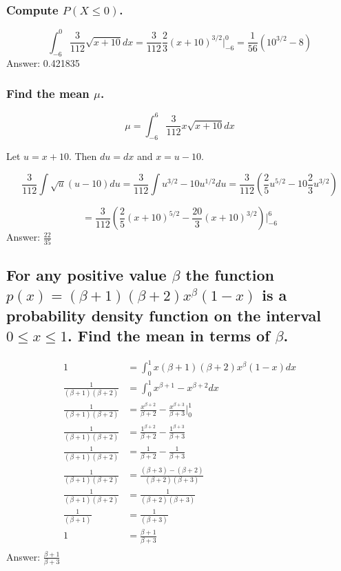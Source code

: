 \documentclass{article}
\begin{document}
\subsubsection{Compute $P(X \leq 0)$.}

\[\int_{-6}^{0} \frac{3}{112} \sqrt{x+10} dx  =\frac{3}{112} \frac{2}{3} (x+10)^{3/2} \Big|_{-6}^0 = \frac{1}{56} (10^{3/2} - 8)\]
Answer: 0.421835

\subsubsection{Find the mean $\mu$.}

\[\mu = \int_{-6}^{6} \frac{3}{112}x \sqrt{x+10} dx\]

Let $u = x+10$. Then $du = dx$ and $x = u-10$. 

\[\frac{3}{112} \int{\sqrt{u}(u-10)du} = \frac{3}{112} \int{u^{3/2}- 10u^{1/2}du} = \frac{3}{112}(\frac{2}{5}u^{5/2} -10\frac{2}{3}u^{3/2}) \]

\[=  \frac{3}{112}(\frac{2}{5}(x+10)^{5/2} -\frac{20}{3}(x+10)^{3/2}) \Big|_{-6}^6\]
Answer: $\frac{22}{35}$

\subsection{For any positive value $\beta$ the function $p(x) = (\beta + 1)(\beta + 2)x^{\beta}(1 - x)$ is a probability density function on the interval $0 \leq x \leq 1$. Find the mean in terms of $\beta$.}

\begin{align*}
1 & = \int_0^1 x(\beta+1)(\beta+2)x^{\beta}(1-x) dx \\
\frac{1}{(\beta+1)(\beta+2)} & = \int_0^1 x^{\beta+1}-x^{\beta+2} dx \\
\frac{1}{(\beta+1)(\beta+2)} & =  \frac{x^{\beta+2}}{\beta+2}  - \frac{x^{\beta+3}}{\beta+3}  \Big|_{0}^1\\
\frac{1}{(\beta+1)(\beta+2)} & =  \frac{1^{\beta+2}}{\beta+2}  - \frac{1^{\beta+3}}{\beta+3} \\
\frac{1}{(\beta+1)(\beta+2)} & =  \frac{1}{\beta+2}  - \frac{1}{\beta+3} \\
\frac{1}{(\beta+1)(\beta+2)} & = \frac{(\beta+3)-(\beta+2)}{(\beta+2)(\beta+3)} \\
\frac{1}{(\beta+1)(\beta+2)} & = \frac{1}{(\beta+2)(\beta+3)} \\
\frac{1}{(\beta+1)} & = \frac{1}{(\beta+3)} \\
1 & = \frac{\beta+1}{\beta+3} \\
\end{align*}
Answer: $\frac{\beta+1}{\beta+3} $
\end{document}
